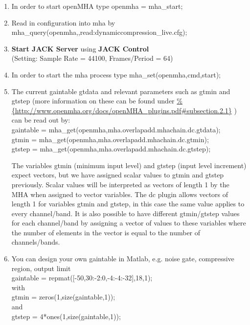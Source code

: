 \documentclass[11pt,a4paper,twoside]{article}
\newcommand{\+}{\discretionary{\mbox{\scriptsize$\hookleftarrow$}}{}{}}
\begin{document}
{{\begin{enumerate}
\item In order to start openMHA type {\ttfamily openmha = mha\_start;} 
\item Read in configuration into mha by \\ {\ttfamily mha\_query(openmha,\textquotesingle{}\textquotesingle{},\textquotesingle{}read:dynamiccompression\_live.cfg\textquotesingle{});}
\item \textbf{Start JACK Server} using \textbf{JACK Control}\\ (Setting: Sample Rate = 44100, Frames/Period = 64)

\item In order to start the mha process type {\ttfamily mha\_set(openmha,\textquotesingle{}cmd\textquotesingle{},\textquotesingle{}start\textquotesingle{});}


\item The current gaintable {\ttfamily gtdata} and relevant parameters such as {\ttfamily gtmin} and {\ttfamily gtstep} (more information on these can be found under {\url{%
          {http://www.openmha.org/docs/openMHA_plugins.pdf#subsection.2.1}}}
\large) can be read out by: \\

{\ttfamily gaintable = mha\_get(openmha,\textquotesingle{}mha.overlapadd.mhachain.dc.gtdata\textquotesingle{});}\\
{\ttfamily gtmin = mha\_get(openmha,\textquotesingle{}mha.overlapadd.mhachain.dc.gtmin\textquotesingle{});}\\
{\ttfamily gtstep = mha\_get(openmha,\textquotesingle{}mha.overlapadd.mhachain.dc.gtstep\textquotesingle{});}



The variables {\ttfamily gtmin} (minimum input level) and {\ttfamily gtstep} (input level increment) expect vectors, but we have assigned scalar values to {\ttfamily gtmin} and {\ttfamily gtstep} previously. Scalar values will be interpreted as vectors of length 1 by the MHA when assigned to vector variables. The dc plugin allows vectors of length 1 for variables {\ttfamily gtmin} and {\ttfamily gtstep}, in this case the same value applies to every channel/band. It is also possible to have different {\ttfamily gtmin}/{\ttfamily gtstep} values for each channel/band by assigning a vector of values to these variables where the number of elements in the vector is equal to the number of channels/bands.

\item You can design your own gaintable in Matlab, e.g. noise gate, compressive region, output limit \\
  {\ttfamily gaintable = repmat([-50,30:-2:0,-4:-4:-32],18,1);} \\
  with \\
  {\ttfamily gtmin = zeros(1,size(gaintable,1));} \\
  and \\
  {\ttfamily gtstep = 4*ones(1,size(gaintable,1));} 
  


\end{enumerate}}}
\end{document}
